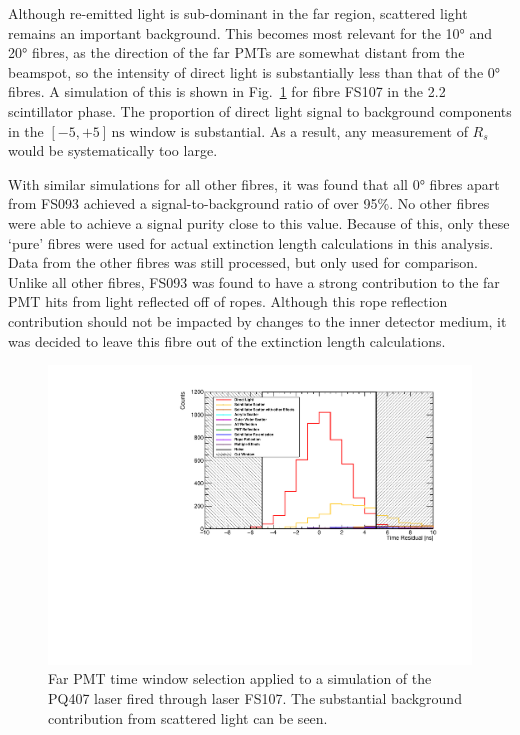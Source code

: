 Although re-emitted light is sub-dominant in the far region, scattered light remains an important background. This becomes most relevant for the \ang{10} and \ang{20} fibres, as the direction of the far PMTs are somewhat distant from the beamspot, so the intensity of direct light is substantially less than that of the \ang{0} fibres. A simulation of this is shown in Fig.~\ref{fig:smellie_PQ407_FS107_far_pmts_components} for fibre FS107 in the \SI{2.2}{\gpl} scintillator phase. The proportion of direct light signal to background components in the $[-5,+5]\,\si{\ns}$ window is substantial. As a result, any measurement of $R_{s}$ would be systematically too large. %

With similar simulations for all other fibres, it was found that all \ang{0} fibres apart from FS093 achieved a signal-to-background ratio of over 95\%. No other fibres were able to achieve a signal purity close to this value. Because of this, only these `pure' fibres were used for actual extinction length calculations in this analysis. Data from the other fibres was still processed, but only used for comparison. Unlike all other fibres, FS093 was found to have a strong contribution to the far PMT hits from light reflected off of ropes. Although this rope reflection contribution should not be impacted by changes to the inner detector medium, it was decided to leave this fibre out of the extinction length calculations.

\begin{figure}
    \centering
    \includegraphics[width=\textwidth]{5_SMELLIEAnalysis/images/far_pmts_tres_components_nice_PQ407_FS107.pdf}
    \caption[Far PMT time window selection applied to a simulation of the PQ407 laser fired through laser FS107]
    {Far PMT time window selection applied to a simulation of the PQ407 laser fired through laser FS107. The substantial background contribution from scattered light can be seen.}
    \label{fig:smellie_PQ407_FS107_far_pmts_components}
\end{figure}


